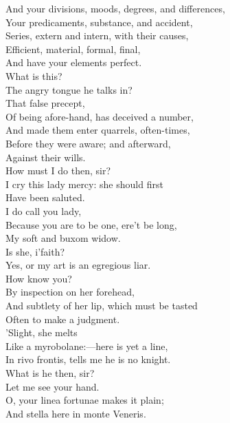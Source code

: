 \documentclass[a4paper,oneside]{memoir}
\begin{document}
\begin{drama*}
And your divisions, moods, degrees, and differences,\\
Your predicaments, substance, and accident,\\
Series, extern and intern, with their causes,\\
Efficient, material, formal, final,\\
And have your elements perfect.\\
\kastrilspeaks {} What is this?\\
The angry tongue he talks in?\\
\subtlespeaks {} That false precept,\\
Of being afore-hand, has deceived a number,\\
And made them enter quarrels, often-times,\\
Before they were aware; and afterward,\\
Against their wills.\\
\kastrilspeaks {} How must I do then, sir?\\
\subtlespeaks I cry this lady mercy: she should first\\
Have been saluted.\\
I do call you lady,\\
Because you are to be one, ere't be long,\\
My soft and buxom widow.\\
\kastrilspeaks {} Is she, i'faith?\\
\subtlespeaks Yes, or my art is an egregious liar.\\
\kastrilspeaks How know you?\\
\subtlespeaks {} By inspection on her forehead,\\
And subtlety of her lip, which must be tasted\\
Often to make a judgment.\\
'Slight, she melts\\
Like a myrobolane:---here is yet a line,\\
In rivo frontis, tells me he is no knight.\\
\pliantspeaks What is he then, sir?\\
\subtlespeaks {} Let me see your hand.\\
O, your linea fortunae makes it plain;\\
And stella here in monte Veneris.\\

\end{drama*}
\end{document}
